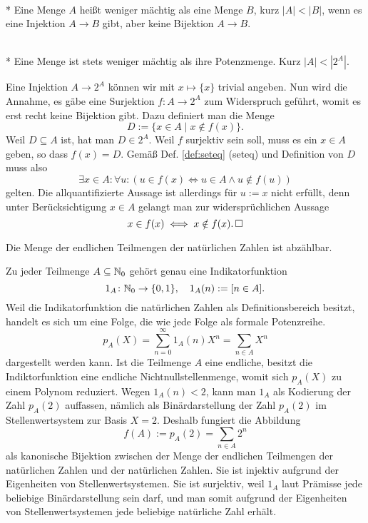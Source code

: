 \begin{Definition}\mbox{}\\*
Eine Menge $A$ heißt weniger mächtig als eine Menge $B$, kurz
$|A|<|B|$, wenn es eine Injektion $A\to B$ gibt, aber keine
Bijektion $A\to B$.
\end{Definition}

\begin{Satz}\mbox{}\\*
Eine Menge ist stets weniger mächtig als ihre Potenzmenge. Kurz $|A|<|2^A|$. 
\end{Satz}

\begin{Beweis}
Eine Injektion $A\to 2^A$ können wir mit $x\mapsto\{x\}$ trivial angeben.
Nun wird die Annahme, es gäbe eine Surjektion $f\colon A\to 2^A$
zum Widerspruch geführt, womit es erst recht keine Bijektion gibt.
Dazu definiert man die Menge
\[D := \{x\in A\mid x\notin f(x)\}.\]
Weil $D\subseteq A$ ist, hat man $D\in 2^A$. Weil $f$ surjektiv sein
soll, muss es ein $x\in A$ geben, so dass $f(x) = D$. Gemäß Def.
\ref{def:seteq} (seteq) und Definition von $D$ muss also
\[\exists x\in A\colon \forall u\colon (u\in f(x) \iff u\in A\land u\notin f(u))\]
gelten. Die allquantifizierte Aussage ist allerdings für $u:=x$ nicht erfüllt,
denn unter Berücksichtigung $x\in A$ gelangt man zur widersprüchlichen
Aussage
\[x\in f(x) \iff x\notin f(x).\,\square\]
\end{Beweis}

\begin{Satz}
Die Menge der endlichen Teilmengen der natürlichen Zahlen ist
abzählbar.
\end{Satz}

\begin{Beweis}
Zu jeder Teilmenge $A\subseteq\mathbb N_0$ gehört genau eine Indikatorfunktion
\[1_A\colon\mathbb N_0\to\{0,1\},\quad 1_A(n) := [n\in A].\]
Weil die Indikatorfunktion die natürlichen Zahlen als Definitionsbereich
besitzt, handelt es sich um eine Folge, die wie jede Folge als formale Potenzreihe.
\[p_A(X) = \sum_{n=0}^\infty 1_A(n)X^n = \sum_{n\in A} X^n\]
dargestellt werden kann. Ist die Teilmenge $A$ eine endliche, besitzt
die Indiktorfunktion eine endliche Nichtnullstellenmenge, womit sich
$p_A(X)$ zu einem Polynom reduziert. Wegen $1_A(n)<2$, kann man
$1_A$ als Kodierung der Zahl $p_A(2)$ auffassen, nämlich als Binärdarstellung
der Zahl $p_A(2)$ im Stellenwertsystem zur Basis $X=2$. Deshalb fungiert
die Abbildung
\[f(A) := p_A(2) = \sum_{n\in A} 2^n\]
als kanonische Bijektion zwischen der Menge der endlichen Teilmengen der
natürlichen Zahlen und der natürlichen Zahlen. Sie ist injektiv
aufgrund der Eigenheiten von Stellenwertsystemen. Sie ist surjektiv,
weil $1_A$ laut Prämisse jede beliebige Binärdarstellung sein darf,
und man somit aufgrund der Eigenheiten von Stellenwertsystemen jede
beliebige natürliche Zahl erhält.\,\qedsymbol
\end{Beweis}

